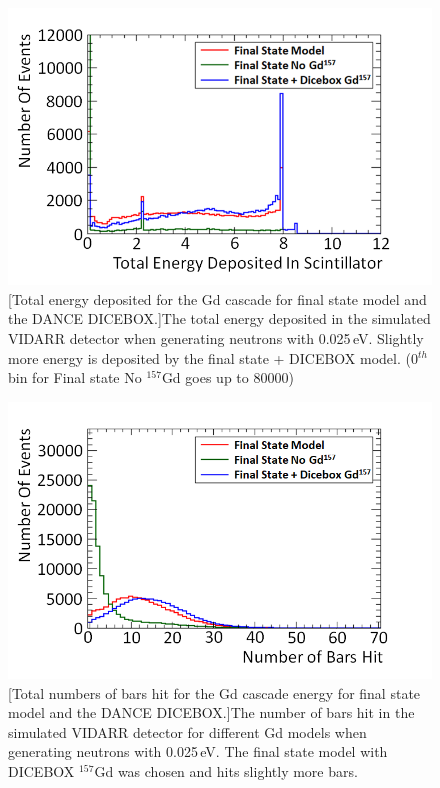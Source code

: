 \begin{figure}[!h]
\centering
\begin{minipage}{.45\textwidth}
  \centering
  \includegraphics[width=\linewidth]{Chapter4/Figs/Raster/finalStateAndDiceBoxBarsDepositedEnergyMedText.png}
  [Total energy deposited for the Gd cascade for final state model and the DANCE DICEBOX.]{The total energy deposited in the simulated VIDARR detector when generating neutrons with 0.025\,eV. Slightly more energy is deposited by the final state + DICEBOX model. (0$^{th}$ bin for Final state No $^{157}$Gd goes up to 80000)} 
  \label{fig:finalStateAndDiceBoxBarsDepositedEnergy}
\end{minipage}%
\qquad
\begin{minipage}{.45\textwidth}
  \centering
  \includegraphics[width=\linewidth]{Chapter4/Figs/Raster/finalStateAndDiceBoxBarsHitMedText.png} 
  [Total numbers of bars hit for the Gd cascade energy for final state model and the DANCE DICEBOX.]{The number of bars hit in the simulated VIDARR detector for different Gd models when generating neutrons with 0.025\,eV. The final state model with DICEBOX $^{157}$Gd was chosen and hits slightly more bars.}
  \vspace{0.478cm} %
  \label{fig:numberOfBarsHitCascadeFinalStateDicebox}
\end{minipage}
\end{figure}


